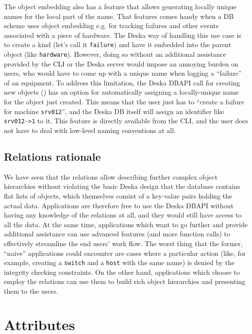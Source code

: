 \documentclass{article}
\begin{document}
The object embedding also has a feature that allows generating locally unique names for the local part of the name.
That features comes handy when a DB scheme uses object embedding e.g. for tracking failures and other events associated
with a piece of hardware.  The Deska way of handling this use case is to create a kind (let's call it {\tt failure}) and
have it embedded into the parent object (like {\tt hardware}).  However, doing so without an additional assistance
provided by the CLI or the Deska server would impose an annoying burden on users, who would have to come up with a
unique name when logging a ``failure'' of an equipment.  To address this limitation, the Deska DBAPI call for creating
new objects () has an option for automatically assigning a locally-unique name for the object
just created.  This means that the user just has to ``create a failure for machine {\tt srv012}'', and the Deska DB
itself will assign an identifier like {\tt srv012->1} to it.  This feature is directly available from the CLI, and the
user does not have to deal with low-level naming conventions at all.

\subsection{Relations rationale}

We have seen that the relations allow describing further complex object hierarchies without violating the basic Deska
design that the database contains flat lists of objects, which themselves consist of a key-value pairs holding the
actual data.  Applications are therefore free to use the Deska DBAPI without having any knowledge of the relations at
all, and they would still have access to all the data.  At the same time, applications which want to go further and
provide additional assistance can use advanced features (and more function calls) to effectively streamline the end
users' work flow.  The worst thing that the former, ``naive'' applications could encounter are cases where a particular
action (like, for example, creating a {\tt switch} and a {\tt host} with the same name) is denied by the integrity
checking constraints.  On the other hand, applications which choose to employ the relations can use them to build rich
object hierarchies and presenting them to the users.

\section{Attributes}
\end{document}
